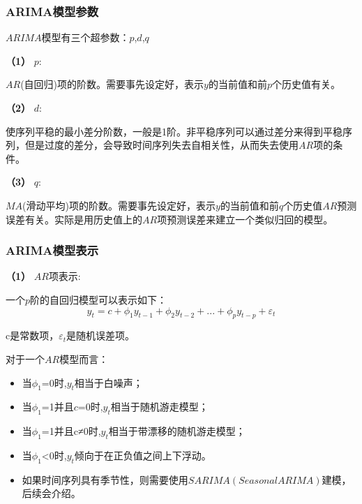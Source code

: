 \documentclass[withoutpreface,bwprint]{cumcmthesis}
\begin{document}
\subsubsection{ARIMA模型参数}

\(ARIMA\)模型有三个超参数：\(p\),\(d\),\(q\)

\textbf{（1）} \(p\):

\hspace{2em} \(AR\)(自回归)项的阶数。需要事先设定好，表示\(y\)的当前值和前\(p\)个历史值有关。

\textbf{（2）} \(d\):

\hspace{2em} 使序列平稳的最小差分阶数，一般是1阶。非平稳序列可以通过差分来得到平稳序列，但是过度的差分，会导致时间序列失去自相关性，从而失去使用\(AR\)项的条件。

\textbf{（3）} \(q\):

\hspace{2em} \(MA\)(滑动平均)项的阶数。需要事先设定好，表示\(y\)的当前值和前\(q\)个历史值\(AR\)预测误差有关。实际是用历史值上的\(AR\)项预测误差来建立一个类似归回的模型。


\subsubsection{ARIMA模型表示}

\textbf{（1）} \(AR\)项表示:

\hspace{2em} 一个\(p\)阶的自回归模型可以表示如下：
\[y_{t} = c + \phi _{1}y_{t-1} +  \phi _{2}y_{t-2} + ...+ \phi _{p}y_{t-p}+\varepsilon _{t} \]

c是常数项，$\varepsilon _{t}$是随机误差项。

对于一个\(AR\)模型而言：

\begin{itemize}[itemindent=2em]

\item 当$\phi _{1}$=0时,$y_{t}$相当于白噪声；

\item 当$\phi _{1}$=1并且\(c\)=0时,$y_{t}$相当于随机游走模型；

\item 当$\phi _{1}$=1并且c≠0时,$y_{t}$相当于带漂移的随机游走模型；

\item 当$\phi _{1}$<0时,$y_{t}$倾向于在正负值之间上下浮动。

\item 如果时间序列具有季节性，则需要使用\(SARIMA(Seasonal ARIMA)\)建模，后续会介绍。

\end{itemize}
\end{document}
